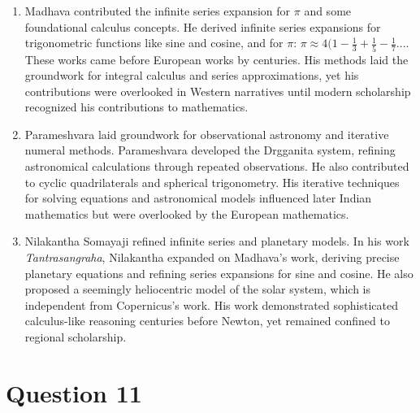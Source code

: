 \documentclass{article}
\begin{document}
\begin{enumerate}
    \item Madhava contributed the infinite series expansion for $\pi$ and some foundational calculus concepts. He derived infinite series expansions for trigonometric functions like sine and cosine, and for $\pi$: $\pi\approx 4(1-\frac{1}{3}+\frac{1}{5}-\frac{1}{7}...$. These works came before European works by centuries. His methods laid the groundwork for integral calculus and series approximations, yet his contributions were overlooked in Western narratives until modern scholarship recognized his contributions to mathematics.\cite{joseph1991crest}
    \item Parameshvara laid groundwork for observational astronomy and iterative numeral methods. Parameshvara developed the Drgganita system, refining astronomical calculations through repeated observations. He also contributed to cyclic quadrilaterals and spherical trigonometry. His iterative techniques for solving equations and astronomical models influenced later Indian mathematics but were overlooked by the European mathematics.\cite{joseph1991crest}
    \item Nilakantha Somayaji refined infinite series and planetary models. In his work \textit{Tantrasangraha}, Nilakantha expanded on Madhava’s work, deriving precise planetary equations and refining series expansions for sine and cosine. He also proposed a seemingly heliocentric model of the solar system, which is independent from Copernicus's work. His work demonstrated sophisticated calculus-like reasoning centuries before Newton, yet remained confined to regional scholarship.\cite{joseph1991crest}
\end{enumerate}

\newpage

\section*{Question 11}
\end{document}
